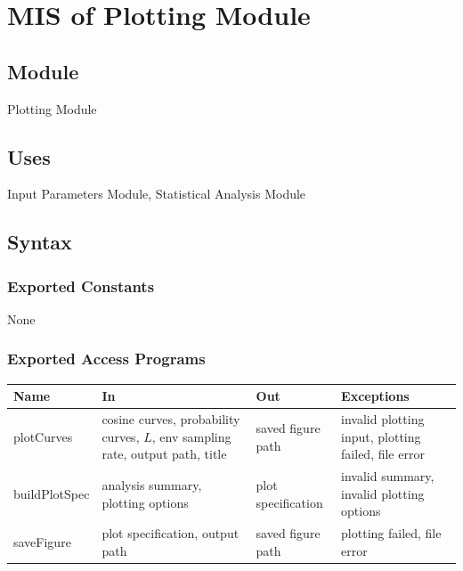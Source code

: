 \documentclass[12pt, titlepage]{article}
\begin{document}
\newpage



\section{MIS of Plotting Module} \label{Module_Plotting}

\subsection{Module}

Plotting Module

\subsection{Uses}

Input Parameters Module, Statistical Analysis Module

\subsection{Syntax}

\subsubsection{Exported Constants}

None

\subsubsection{Exported Access Programs}

\begin{center}
\begin{tabular}{p{3.6cm} p{4.8cm} p{3.8cm} p{3.0cm}}
\hline
\textbf{Name} & \textbf{In} & \textbf{Out} & \textbf{Exceptions} \\
\hline
plotCurves &
cosine curves, probability curves, $L$, env sampling rate, output path, title &
saved figure path &
invalid plotting input, plotting failed, file error \\

buildPlotSpec &
analysis summary, plotting options &
plot specification &
invalid summary, invalid plotting options \\

saveFigure &
plot specification, output path &
saved figure path &
plotting failed, file error \\
\hline
\end{tabular}
\end{center}
\end{document}
